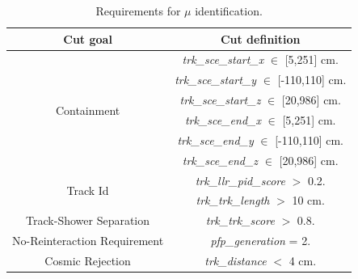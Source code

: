 \begin{table}[h!]
\centering
\setlength{\tabcolsep}{10pt}
\renewcommand{\arraystretch}{1.25}
 \begin{tabular}{| c | c |} 
 \hline
 Cut goal & Cut definition \\
 \hline\hline
\multirow{6}{*}{ Containment } &
     \emph{trk\_sce\_start\_x} $\in$ [5,251] cm. \\&
     \emph{trk\_sce\_start\_y} $\in$ [-110,110] cm.\\&
     \emph{trk\_sce\_start\_z} $\in$ [20,986] cm.\\&
     \emph{trk\_sce\_end\_x} $\in$ [5,251] cm.\\&
     \emph{trk\_sce\_end\_y} $\in$ [-110,110] cm.\\&
     \emph{trk\_sce\_end\_z} $\in$ [20,986] cm.\\
   \hline
 \multirow{2}{*}{ Track Id } &
     \emph{trk\_llr\_pid\_score} $>$ 0.2.\\&
     \emph{trk\_trk\_length} $>$ 10 cm.\\
     \hline
 \multirow{1}{*}{ Track-Shower Separation } &     
          \emph{trk\_trk\_score} $>$ 0.8.\\ 
     \hline
 \multirow{1}{*}{ No-Reinteraction Requirement } &     
                    \emph{pfp\_generation} = 2.\\
  \hline          
 \multirow{1}{*}{ Cosmic Rejection } & \emph{trk\_distance} $<$ 4 cm.\\
 \hline
 \end{tabular}
 \caption{\label{tab:findthemuon} Requirements for $\mu$ identification.}
\end{table}



